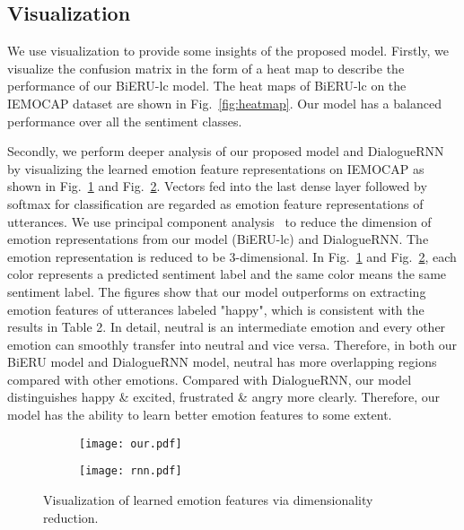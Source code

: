 \documentclass[journal]{IEEEtran}
\begin{document}
\subsection{Visualization}
We use visualization to provide some insights of the proposed model. Firstly, we visualize the confusion matrix in the form of a heat map to describe the performance of our BiERU-lc model. The heat maps of BiERU-lc on the IEMOCAP dataset are shown in Fig.~\ref{fig:heatmap}.
Our model has a balanced performance over all the sentiment classes.

Secondly, we perform deeper analysis of our proposed model and DialogueRNN by visualizing the learned emotion feature representations on IEMOCAP as shown in Fig.~\ref{fig:Dimensionality Reduction of BiERU} and Fig.~\ref{fig:Dimensionality Reduction of DialogueRNN}. Vectors fed into the last dense layer followed by softmax for classification are regarded as emotion feature representations of utterances. We use principal component analysis~\cite{wold1987principal} to reduce the dimension of emotion representations from our model (BiERU-lc) and DialogueRNN. The emotion representation is reduced to be 3-dimensional. In Fig.~\ref{fig:Dimensionality Reduction of BiERU} and Fig.~\ref{fig:Dimensionality Reduction of DialogueRNN}, each color represents a predicted sentiment label and the same color means the same sentiment label. The figures show that our model outperforms on extracting emotion features of utterances labeled "happy", which is consistent with the results in Table 2. In detail, neutral is an intermediate emotion and every other emotion can smoothly transfer into neutral and vice versa. Therefore, in both our BiERU model and DialogueRNN model, neutral has more overlapping regions compared with other emotions. Compared with DialogueRNN, our model distinguishes happy \& excited, frustrated \& angry more clearly. Therefore, our model has the ability to learn better emotion features to some extent.

\begin{figure}[ht!]
\centering
\begin{subfigure}{0.35\textwidth}
    \texttt{[image: our.pdf]}
    \label{fig:Dimensionality Reduction of BiERU}
\end{subfigure}
\begin{subfigure}{0.35\textwidth}
    \texttt{[image: rnn.pdf]}
\label{fig:Dimensionality Reduction of DialogueRNN}
\end{subfigure}
\linespread{1}
\caption{Visualization of learned emotion features via dimensionality reduction.}
\label{fig:DR}
\end{figure}{}
\end{document}
